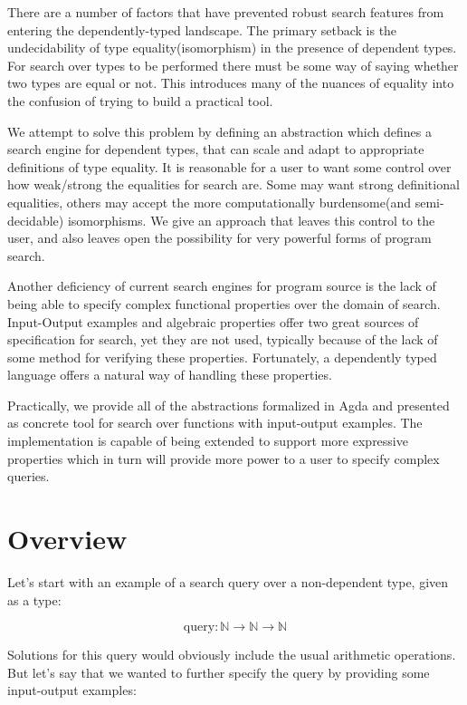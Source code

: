 \documentclass[acmsmall,review,authorversion]{acmart}
\newcommand{\?}{\stackrel{?}{\approx}}
\begin{document}
There are a number of factors that have prevented robust search features from
entering the dependently-typed landscape. The primary setback is the
undecidability of type equality(isomorphism) in the presence of dependent types.
For search over types to be performed there must be some way of saying whether
two types are equal or not. This introduces many of the nuances of equality into
the confusion of trying to build a practical tool.

We attempt to solve this problem by defining an abstraction which defines a
search engine for dependent types, that can scale and adapt to appropriate
definitions of type equality. It is reasonable for a user to want some control
over how weak/strong the equalities for search are. Some may want strong
definitional equalities, others may accept the more computationally burdensome(and
semi-decidable) isomorphisms. We give an approach that leaves this control to
the user, and also leaves open the possibility for very powerful forms of
program search.

Another deficiency of current search engines for program source is the lack of
being able to specify complex functional properties over the domain of search.
Input-Output examples and algebraic properties offer two great sources of
specification for search, yet they are not used, typically because of the lack
of some method for verifying these properties. Fortunately, a dependently
typed language offers a natural way of handling these properties.

Practically, we provide all of the abstractions formalized in Agda and presented
as concrete tool for search over functions with input-output examples. The
implementation is capable of being extended to support more expressive
properties which in turn will provide more power to a user to specify complex
queries.

\section{Overview}

Let's start with an example of a search query over a non-dependent type, given
as a type:

$$
\text{query} : \mathbb{N} \rightarrow \mathbb{N} \rightarrow \mathbb{N}
$$

Solutions for this query would obviously include the usual arithmetic
operations. But let's say that we wanted to further specify the query by
providing some input-output examples:
\end{document}
